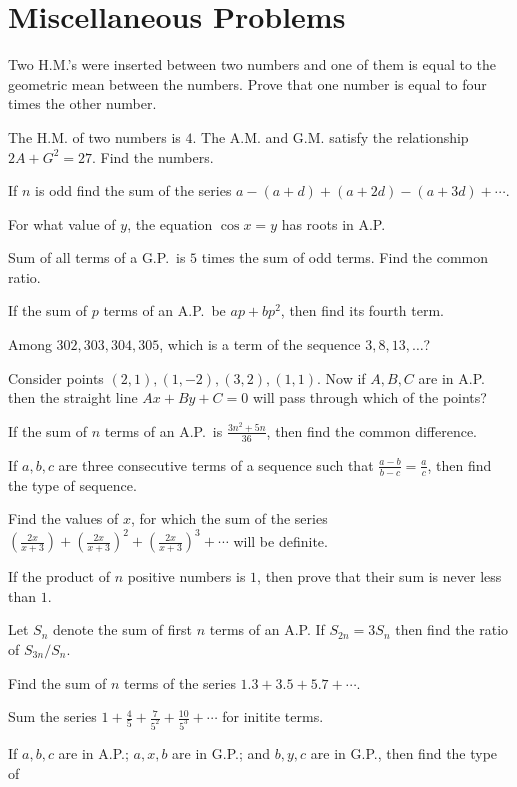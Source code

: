 \chapter{Miscellaneous Problems}
\startitemize[n, 1*broad]
\item Two H.M.'s were inserted between two numbers and one of them is equal to the geometric mean between
  the numbers. Prove that one number is equal to four times the other number.
\item The H.M. of two numbers is $4$. The A.M.  and G.M.  satisfy the relationship $2A +
  G^2 = 27$. Find the numbers.
\item If $n$ is odd find the sum of the series $a - (a + d) + (a + 2d) - (a + 3d) + \cdots$.
\item For what value of $y$, the equation $\cos x = y$ has roots in A.P.
\item Sum of all terms of a G.P.\ is $5$ times the sum of odd terms. Find the common ratio.
\item If the sum of $p$ terms of an A.P.\ be $ap + bp^2$, then find its fourth term.
\item Among $302, 303, 304, 305$, which is a term of the sequence $3, 8, 13, \ldots$?
\item Consider points $(2, 1), (1, -2), (3, 2), (1, 1)$. Now if $A, B, C$ are in A.P. then the straight line
  $Ax + By + C = 0$ will pass through which of the points?
\item If the sum of $n$ terms of an A.P.\ is $\frac{3n^2 + 5n}{36}$, then find the common difference.
\item If $a, b, c$ are three consecutive terms of a sequence such that $\frac{a - b}{b - c} = \frac{a}{c}$,
  then find the type of sequence.
\item Find the values of $x$, for which the sum of the series $\left(\frac{2x}{x + 3}\right)
  + \left(\frac{2x}{x + 3}\right)^2 + \left(\frac{2x}{x + 3}\right)^3 + \cdots$ will be definite.
\item If the product of $n$ positive numbers is $1$, then prove that their sum is never less than $1$.
\item Let $S_n$ denote the sum of first $n$ terms of an A.P. If $S_{2n} = 3S_n$ then find the ratio of
  $S_{3n}/S_n$.
\item Find the sum of $n$ terms of the series $1.3 + 3.5 + 5.7 + \cdots$.
\item Sum the series $1 + \frac{4}{5} + \frac{7}{5^2} + \frac{10}{5^3} + \cdots$ for initite terms.
\item If $a, b, c$ are in A.P.; $a, x, b$ are in G.P.; and $b, y, c$ are in G.P., then find the type of
